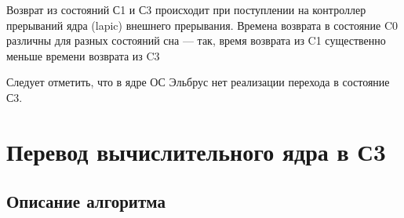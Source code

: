 \documentclass{article}
\begin{document}
Возврат из состояний С1 и С3 происходит при поступлении на контроллер прерываний ядра (lapic) внешнего прерывания. Времена возврата в состояние C0 различны для разных состояний сна --- так, время возврата из C1 существенно меньше времени возврата из C3

Следует отметить, что в ядре ОС Эльбрус нет реализации перехода в состояние С3.


\newpage
\section{Перевод вычислительного ядра в С3 }

\subsection{Описание алгоритма}
\end{document}
